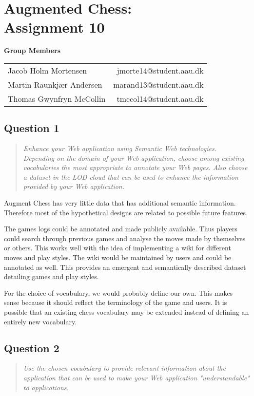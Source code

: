 \documentclass[10pt,a4paper]{report}
\begin{document}
\chapter{Augmented Chess:\\ Assignment 10}

\begin{center}
	{\Large \textbf{Group Members}}
	\begin{tabular}{l r}
		Jacob Holm Mortensen            &       jmorte14@student.aau.dk\\
		Martin Raunkjær Andersen        &       marand13@student.aau.dk\\
		Thomas Gwynfryn McCollin        &       tmccol14@student.aau.dk
	\end{tabular}
\end{center}

\section{Question 1}
\begin{quote}
\textit{Enhance your Web application using Semantic Web technologies. Depending on the domain of your Web application, choose among existing vocabularies the most appropriate to annotate your Web pages. Also choose a dataset in the LOD cloud that can be used to enhance the information provided by your Web application.}
\end{quote}

Augment Chess has very little data that has additional semantic information. Therefore most of the hypothetical designs are related to possible future features.

The games logs could be annotated and made publicly available. Thus players could search through previous games and analyse the moves made by themselves or others. This works well with the idea of implementing a wiki for different moves and play styles. The wiki would be maintained by users and could be annotated as well. This provides an emergent and semantically described dataset detailing games and play styles.

For the choice of vocabulary, we would probably define our own. This makes sense because it should reflect the terminology of the game and users. It is possible that an existing chess vocabulary may be extended instead of defining an entirely new vocabulary.

\section{Question 2}
\begin{quote}
\textit{Use the chosen vocabulary to provide relevant information about the application that can be used to make your Web application "understandable" to applications.}
\end{quote}
\end{document}
